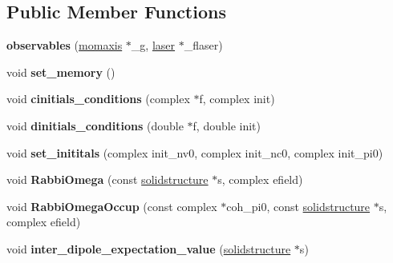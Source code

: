 \subsection*{Public Member Functions}
\begin{DoxyCompactItemize}
\item 
\mbox{\label{classobservables_a6cc7e52fb68531931aec45a5383ccd29}} 
{\bfseries observables} (\hyperlink{classmomaxis}{momaxis} $\ast$\+\_\+g, \hyperlink{classlaser}{laser} $\ast$\+\_\+flaser)
\item 
\mbox{\label{classobservables_aff34478aeb9c5eea78e4d57ced5fe98b}} 
void {\bfseries set\+\_\+memory} ()
\item 
\mbox{\label{classobservables_a2a99a6fdea8934916376a85445e5dda7}} 
void {\bfseries cinitials\+\_\+conditions} (complex $\ast$f, complex init)
\item 
\mbox{\label{classobservables_a44e7a5551b2d4584213f150811620f87}} 
void {\bfseries dinitials\+\_\+conditions} (double $\ast$f, double init)
\item 
\mbox{\label{classobservables_a93447381d653ad3a89820e0c2eb3233c}} 
void {\bfseries set\+\_\+inititals} (complex init\+\_\+nv0, complex init\+\_\+nc0, complex init\+\_\+pi0)
\item 
\mbox{\label{classobservables_a34d81f1cc5726843101aac84d5a2e0ef}} 
void {\bfseries Rabbi\+Omega} (const \hyperlink{classsolidstructure}{solidstructure} $\ast$s, complex efield)
\item 
\mbox{\label{classobservables_afac819fbfe4ec090099144956a0df53e}} 
void {\bfseries Rabbi\+Omega\+Occup} (const complex $\ast$coh\+\_\+pi0, const \hyperlink{classsolidstructure}{solidstructure} $\ast$s, complex efield)
\item 
\mbox{\label{classobservables_abb8b5173e2863054f2eae84663893958}} 
void {\bfseries inter\+\_\+dipole\+\_\+expectation\+\_\+value} (\hyperlink{classsolidstructure}{solidstructure} $\ast$s)
\item 
\mbox{\label{classobservables_adb0c22bd6b519e9cd3a7844a65f152d5}} 

\end{DoxyCompactItemize}
